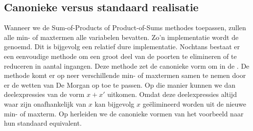 \subsection{Canonieke versus standaard realisatie}
\label{ss:canoniekestandaardrealisatie}
Wanneer we de Sum-of-Products of Product-of-Sums methodes toepassen, zullen alle min- of maxtermen alle variabelen bevatten. Zo'n implementatie wordt de  genoemd. Dit is bijgevolg een relatief dure implementatie. Nochtans bestaat er een eenvoudige methode om een groot deel van de poorten te elimineren of te reduceren in aantal ingangen. Deze methode zet de canonieke vorm om in de . De methode komt er op neer verschillende min- of maxtermen samen te nemen door er de wetten van De Morgan op toe te passen. Op die manier kunnen we dan deelexpressies van de vorm $x+x'$ uitkomen. Omdat deze deelexpressies altijd waar zijn onafhankelijk van $x$ kan bijgevolg $x$ geëlimineerd worden uit de nieuwe min- of maxterm. Op  herleiden we de canonieke vormen van het voorbeeld naar hun standaard equivalent.
